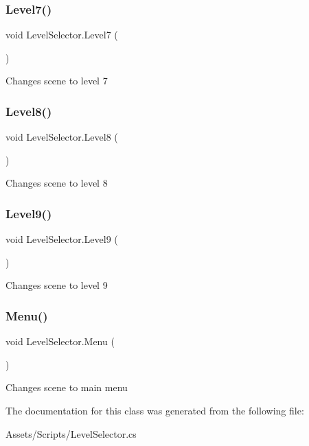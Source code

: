 \subsubsection{\texorpdfstring{Level7()}{Level7()}}
{\footnotesize\ttfamily void Level\+Selector.\+Level7 (\begin{DoxyParamCaption}{ }\end{DoxyParamCaption})\hspace{0.3cm}{\ttfamily [inline]}}

Changes scene to level 7 \mbox{\label{class_level_selector_a902e7d01b59f6c6affb89c28c9529a88}} 
\subsubsection{\texorpdfstring{Level8()}{Level8()}}
{\footnotesize\ttfamily void Level\+Selector.\+Level8 (\begin{DoxyParamCaption}{ }\end{DoxyParamCaption})\hspace{0.3cm}{\ttfamily [inline]}}

Changes scene to level 8 \mbox{\label{class_level_selector_a8be23d6e76b3eaf708f2ddeb733addac}} 
\subsubsection{\texorpdfstring{Level9()}{Level9()}}
{\footnotesize\ttfamily void Level\+Selector.\+Level9 (\begin{DoxyParamCaption}{ }\end{DoxyParamCaption})\hspace{0.3cm}{\ttfamily [inline]}}

Changes scene to level 9 \mbox{\label{class_level_selector_a3fe4d7253904b5b7556aa52401136b45}} 
\subsubsection{\texorpdfstring{Menu()}{Menu()}}
{\footnotesize\ttfamily void Level\+Selector.\+Menu (\begin{DoxyParamCaption}{ }\end{DoxyParamCaption})\hspace{0.3cm}{\ttfamily [inline]}}

Changes scene to main menu 

The documentation for this class was generated from the following file\+:\begin{DoxyCompactItemize}
\item 
Assets/\+Scripts/Level\+Selector.\+cs\end{DoxyCompactItemize}
